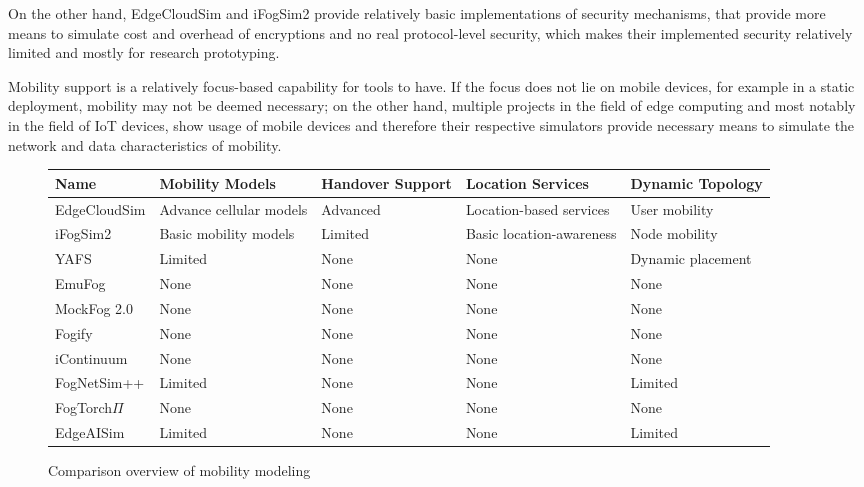 On the other hand, EdgeCloudSim and iFogSim2 provide relatively basic implementations of security mechanisms, that provide more means to simulate cost and overhead of encryptions and no real protocol-level security, which makes their implemented security relatively limited and mostly for research prototyping.

Mobility support is a relatively focus-based capability for tools to have. 
If the focus does not lie on mobile devices, for example in a static deployment, mobility may not be deemed necessary; on the other hand, multiple projects in the field of edge computing and most notably in the field of IoT devices, show usage of mobile devices and therefore their respective simulators provide necessary means to simulate the network and data characteristics of mobility.
\begin{figure}[H]
  \centering
  \begin{tabularx}{\textwidth}{ l | X | X | X | X }
    \hline
    \textbf{Name} & \textbf{Mobility Models} & \textbf{Handover Support} & \textbf{Location Services} & \textbf{Dynamic Topology}\\
    \hline\hline
    EdgeCloudSim  & Advance cellular models & Advanced  & Location-based services   & User mobility \\\hline
    iFogSim2      & Basic mobility models   & Limited   & Basic location-awareness  & Node mobility \\\hline
    YAFS          & Limited                 & None      & None                      & Dynamic placement \\\hline
    EmuFog        & None                    & None      & None                      & None \\\hline
    MockFog 2.0   & None                    & None      & None                      & None \\\hline
    Fogify        & None                    & None      & None                      & None \\\hline
    iContinuum    & None                    & None      & None                      & None \\\hline
    FogNetSim++   & Limited                 & None      & None                      & Limited  \\\hline
    FogTorch$\Pi$ & None                    & None      & None                      & None \\\hline
    EdgeAISim     & Limited                 & None      & None                      & Limited \\\hline
  \end{tabularx}
  \caption{Comparison overview of mobility modeling}
  \label{tab:analysis-mobility}
\end{figure}

